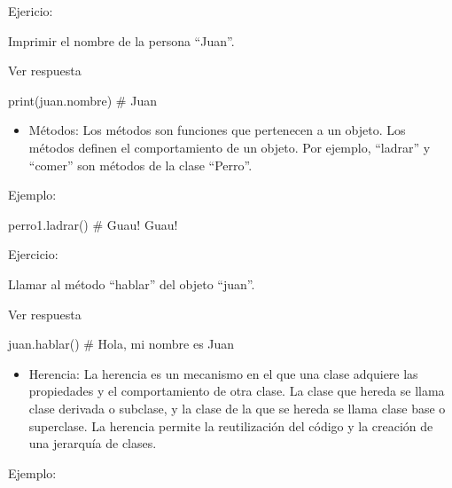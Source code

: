 \documentclass[
  a4paper,
  DIV=11,
  numbers=noendperiod,
  onepage,
  openany]{scrreprt}
\newenvironment{Shaded}{\begin{snugshade}}{\end{snugshade}}
\newcommand{\BuiltInTok}[1]{\textcolor[rgb]{0.00,0.23,0.31}{#1}}
\newcommand{\CommentTok}[1]{\textcolor[rgb]{0.37,0.37,0.37}{#1}}
\newcommand{\NormalTok}[1]{\textcolor[rgb]{0.00,0.23,0.31}{#1}}
\providecommand{\tightlist}{%
  \setlength{\itemsep}{0pt}\setlength{\parskip}{0pt}}\usepackage{longtable,booktabs,array}
\begin{document}
Ejericio:

Imprimir el nombre de la persona ``Juan''.

Ver respuesta

\begin{Shaded}
\begin{Highlighting}[]
\BuiltInTok{print}\NormalTok{(juan.nombre)  }\CommentTok{\# Juan}
\end{Highlighting}
\end{Shaded}

\begin{itemize}
\tightlist
\item
  Métodos: Los métodos son funciones que pertenecen a un objeto. Los
  métodos definen el comportamiento de un objeto. Por ejemplo,
  ``ladrar'' y ``comer'' son métodos de la clase ``Perro''.
\end{itemize}

Ejemplo:

\begin{Shaded}
\begin{Highlighting}[]
\NormalTok{perro1.ladrar()  }\CommentTok{\# Guau! Guau!}
\end{Highlighting}
\end{Shaded}

Ejercicio:

Llamar al método ``hablar'' del objeto ``juan''.

Ver respuesta

\begin{Shaded}
\begin{Highlighting}[]
\NormalTok{juan.hablar()  }\CommentTok{\# Hola, mi nombre es Juan}
\end{Highlighting}
\end{Shaded}

\begin{itemize}
\tightlist
\item
  Herencia: La herencia es un mecanismo en el que una clase adquiere las
  propiedades y el comportamiento de otra clase. La clase que hereda se
  llama clase derivada o subclase, y la clase de la que se hereda se
  llama clase base o superclase. La herencia permite la reutilización
  del código y la creación de una jerarquía de clases.
\end{itemize}

Ejemplo:
\end{document}
